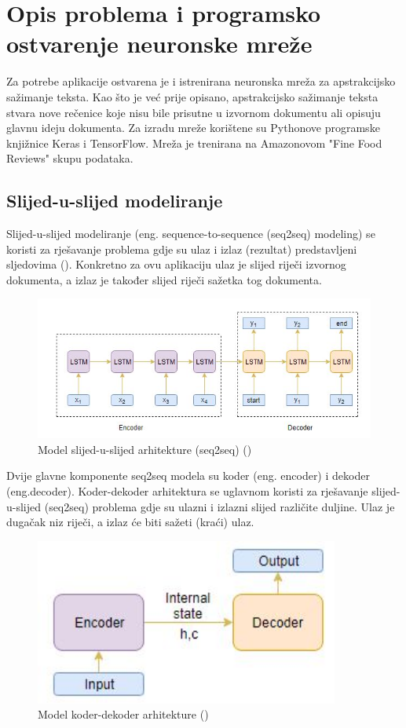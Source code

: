 \documentclass[times, utf8, zavrsni, numeric]{fer}
\begin{document}
\chapter{Opis problema i programsko ostvarenje neuronske mreže}
Za potrebe aplikacije ostvarena je i istrenirana neuronska mreža za apstrakcijsko sažimanje teksta. Kao što je već prije opisano, apstrakcijsko sažimanje teksta stvara nove rečenice koje nisu bile prisutne u izvornom dokumentu ali opisuju glavnu ideju dokumenta.
Za izradu mreže korištene su Pythonove programske knjižnice Keras i TensorFlow.
Mreža je trenirana na Amazonovom "Fine Food Reviews" skupu podataka.
\section{Slijed-u-slijed modeliranje}
Slijed-u-slijed modeliranje (eng. sequence-to-sequence (seq2seq) modeling) se koristi za rješavanje problema gdje su ulaz i izlaz (rezultat) predstavljeni sljedovima (\citet{article3}).
Konkretno za ovu aplikaciju ulaz je slijed riječi izvornog dokumenta, a izlaz je također slijed riječi sažetka tog dokumenta.
\begin{figure}[htb]
\centering
\includegraphics[width=15cm]{img/seq2seq-model.jpg}
\caption{Model slijed-u-slijed arhitekture (seq2seq) (\citet{article3})}
\label{fig:seq2seq-model}
\end{figure}
Dvije glavne komponente seq2seq modela su koder (eng. encoder) i dekoder (eng.decoder).
Koder-dekoder arhitektura se uglavnom koristi za rješavanje slijed-u-slijed (seq2seq) problema gdje su ulazni i izlazni slijed različite duljine.
Ulaz je dugačak niz riječi, a izlaz će biti sažeti (kraći) ulaz.
\begin{figure}[htb]
\centering
\includegraphics[width=10cm]{img/encoder-decoder-architecture.jpg}
\caption{Model koder-dekoder arhitekture (\citet{article3})}
\label{fig:encoder-decoder}
\end{figure}
\end{document}
